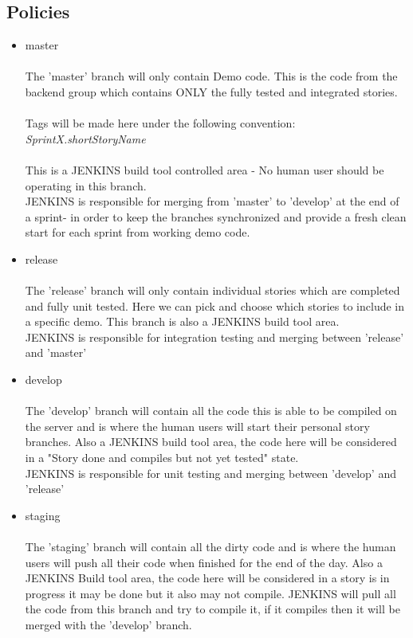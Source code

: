 \subsection {Policies}
\begin{itemize}
\item master\\ \\
The 'master' branch will only contain Demo code. This is the code from the backend group which contains ONLY the fully tested and integrated stories.  \\\\Tags will be made here under the following convention:\\ \emph{SprintX.shortStoryName} \\\\
This is a JENKINS build tool controlled area - No human user should be operating in this branch. \\JENKINS is responsible for  merging from 'master' to 'develop' at the end of a sprint- in order to keep the branches synchronized and provide a fresh clean start for each sprint from working demo code.\\
\item release\\ \\
The 'release' branch will only contain individual stories which are completed and fully unit tested. Here we can pick and choose which stories to include in a specific demo. This branch is also a JENKINS build tool area. \\JENKINS is responsible for integration testing and merging between 'release' and 'master'
\item develop\\ \\
The 'develop' branch will contain all the code this is able to be compiled on the server and is where the human users will start their personal story branches. Also a JENKINS build tool area, the code here will be considered in a "Story done and compiles but not yet tested" state.\\ JENKINS is responsible for unit testing and merging between 'develop' and 'release'

\item staging \\ \\
The 'staging' branch will contain all the dirty code and is where the human users will push all their code when finished for the end of the day. Also a JENKINS Build tool area, the code here will be considered in a story is in progress it may be done but it also may not compile. JENKINS will pull all the code from this branch and try to compile it, if it compiles then it will be merged with the 'develop' branch.


\end{itemize}
